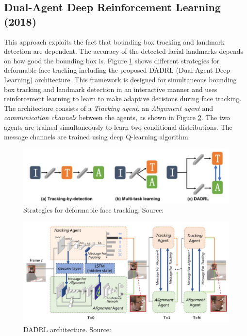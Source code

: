 \documentclass{llncs}
\begin{document}
\subsection{Dual-Agent Deep Reinforcement Learning (2018) \cite{dadrl}}
This approach exploits the fact that bounding box tracking and landmark detection are dependent. The accuracy of the detected facial landmarks depends on how good the bounding box is.
Figure \ref{deformable_face_tracking} shows different strategies for deformable face tracking including the proposed DADRL (Dual-Agent Deep Learning) architecture. This framework is designed for simultaneous bounding box tracking and landmark detection in an interactive manner and uses reinforcement learning to learn to make adaptive decisions during face tracking. The architecture consists of a \textit{Tracking agent}, an \textit{Alignment agent} and \textit{communication channels} between the agents, as shown in Figure \ref{dadrl_architecture}. The two agents are trained simultaneously to learn two conditional distributions.  The message channels are trained using deep Q-learning algorithm.

\begin{figure}
\centering
\includegraphics[scale=0.5]{Media/deformable_face_tracking}
\caption{Strategies for deformable face tracking. Source:\cite{dadrl}}
\label{deformable_face_tracking}
\end{figure}

\begin{figure}
	\centering
	\includegraphics[scale=0.5]{Media/DADRL}
	\caption{DADRL architecture. Source:\cite{dadrl}}
	\label{dadrl_architecture}
\end{figure}
\end{document}

